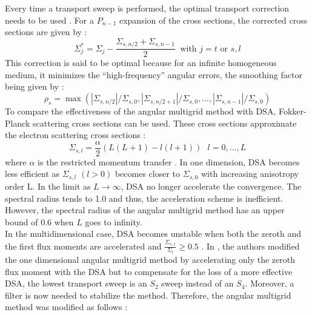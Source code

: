 Every time a transport sweep is performed, the optimal transport correction
needs to be used \cite{multigrid_1d}. For a $P_{n-1}$ expansion of the cross
sections, the corrected cross sections are given by :
\begin{equation}
\Sigma_{j}^* = \Sigma_{j} -\frac{\Sigma_{s,n/2}+\Sigma_{s,n-1}}{2}\ 
\textrm{ with }j=t \textrm{ or }s,l
\end{equation}
This correction is said to be optimal because for an infinite homogeneous medium, 
it minimizes the ``high-frequency'' angular errors, the smoothing factor being 
given by :
\begin{equation}
\rho_s =
\max(|\Sigma_{s,n/2}|/\Sigma_{s,0},|\Sigma_{s,n/2+1}|/\Sigma_{s,0},\hdots,
|\Sigma_{s,n-1}|/\Sigma_{s,0})
\end{equation}
To compare the effectiveness of the angular multigrid method with DSA, 
Fokker-Planck scattering cross sections can be used. These cross sections 
approximate the electron scattering cross sections \cite{morel_81} :
\begin{equation}
\Sigma_{s,l} = \frac{\alpha}{2} (L(L+1)-l(l+1))\ \ \ l=0,\hdots,L
\end{equation}
where $\alpha$ is the restricted momentum transfer \cite{morel_96}. In one dimension,
DSA becomes less efficient as $\Sigma_{s,l}$ $(l>0)$ becomes closer to
$\Sigma_{s,0}$ with increasing anisotropy order L. In the limit as 
$L\rightarrow \infty$, DSA no
longer accelerate the convergence. The spectral radius tends to 1.0 and thus,
the acceleration scheme is inefficient. However, the spectral radius of the
angular multigrid method has an upper bound of 0.6 when $L$ goes to
infinity.\\
In the multidimensional case, DSA becomes unstable when both the zeroth
and the first flux moments are accelerated and $\frac{\Sigma_{s,1}}{\Sigma_t}
\geq 0.5$ \cite{multisweep}. In \cite{multigrid_2d}, the authors modified the
one dimensional angular multigrid method by accelerating only the zeroth flux
moment with the DSA but to compensate for the loss of a more effective DSA,
the lowest transport sweep is an $S_2$ sweep instead of an $S_4$. Moreover, a
filter is now needed to stabilize the method. Therefore, the angular multigrid 
method was modified as follows \cite{multigrid_2d} :
